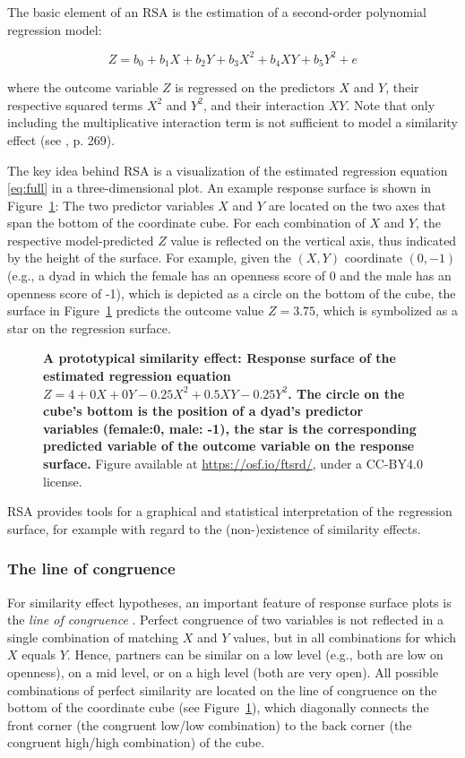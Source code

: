 \documentclass[jou,a4paper,draftfirst]{apa6}
\newcommand{\added}[1]{\textcolor{colour_added}{\bf{#1}}}
\begin{document}
The basic element of an RSA is the estimation of a second-order polynomial regression model:

\begin{equation} 
\label{eq:full}
Z = b_0 + b_1 X + b_2 Y + b_3 X^2 + b_4 X Y + b_5 Y^2 + e
\end{equation}

where the outcome variable $Z$ is regressed on the predictors $X$ and $Y$, their respective squared terms $X^2$ and $Y^2$, and their interaction $XY$. Note that only including the multiplicative interaction term is not sufficient to model a similarity effect (see , p. 269).

The key idea behind RSA is a visualization of the estimated regression equation \eqref{eq:full} in a three-dimensional plot. An example response surface is shown in Figure~\ref{fig:sqd}: The two predictor variables $X$ and $Y$ are located on the two axes that span the bottom of the coordinate cube. For each combination of $X$ and $Y$, the respective model-predicted $Z$ value is reflected on the vertical axis, thus indicated by the height of the surface. For example, given the $(X,Y)$ coordinate $(0,-1)$ (e.g., a dyad in which the female has an openness score of 0 and the male has an openness score of -1), which is depicted as a circle on the bottom of the cube, the surface in Figure~\ref{fig:sqd} predicts the outcome value $Z = 3.75$, which is symbolized as a star on the regression surface.

\begin{figure}[ht!]
\centering
{}
\caption{\added{A prototypical similarity effect: Response surface of the estimated regression equation $Z = 4 + 0X + 0Y - 0.25X^2 + 0.5XY - 0.25Y^2$. The circle on the cube's bottom is the position of a dyad's predictor variables (female:0, male: -1), the star is the corresponding predicted variable of the outcome variable on the response surface.} Figure available at \url{https://osf.io/ftsrd/}, under a CC-BY4.0 license.}
\label{fig:sqd}
\end{figure}

RSA provides tools for a graphical and statistical interpretation of the regression surface, for example with regard to the (non-)existence of similarity effects. 

\subsubsection{The line of congruence}
For similarity effect hypotheses, an important feature of response surface plots is the \textit{line of congruence} \parencite[LOC,][]{edwards_relationship_2007}. Perfect congruence of two variables is not reflected in a single combination of matching $X$ and $Y$ values, but in all combinations for which $X$ equals $Y$. Hence, partners can be similar on a low level (e.g., both are low on openness), on a mid level, or on a high level (both are very open). All possible combinations of perfect similarity are located on the line of congruence on the bottom of the coordinate cube (see Figure~\ref{fig:sqd}), which diagonally connects the front corner (the congruent low/low combination) to the back corner (the congruent high/high combination) of the cube.
\end{document}
